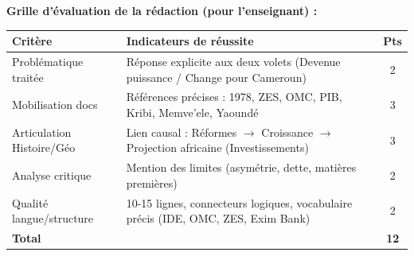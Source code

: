 \documentclass[11pt]{article}
\begin{document}
\begin{exoresolu}
\textbf{Grille d'évaluation de la rédaction (pour l'enseignant) :}
\begin{center}
\begin{tabularx}{\linewidth}{|l|X|c|}\hline
\textbf{Critère} & \textbf{Indicateurs de réussite} & \textbf{Pts} \\ \hline
Problématique traitée & Réponse explicite aux deux volets (Devenue puissance / Change pour Cameroun) & 2 \\ \hline
Mobilisation docs & Références précises : 1978, ZES, OMC, PIB, Kribi, Memve'ele, Yaoundé & 3 \\ \hline
Articulation Histoire/Géo & Lien causal : Réformes $\rightarrow$ Croissance $\rightarrow$ Projection africaine (Investissements) & 3 \\ \hline
Analyse critique & Mention des limites (asymétrie, dette, matières premières) & 2 \\ \hline
Qualité langue/structure & 10-15 lignes, connecteurs logiques, vocabulaire précis (IDE, OMC, ZES, Exim Bank) & 2 \\ \hline
\textbf{Total} & & \textbf{12} \\ \hline
\end{tabularx}
\end{center}
\end{exoresolu}
\end{document}
